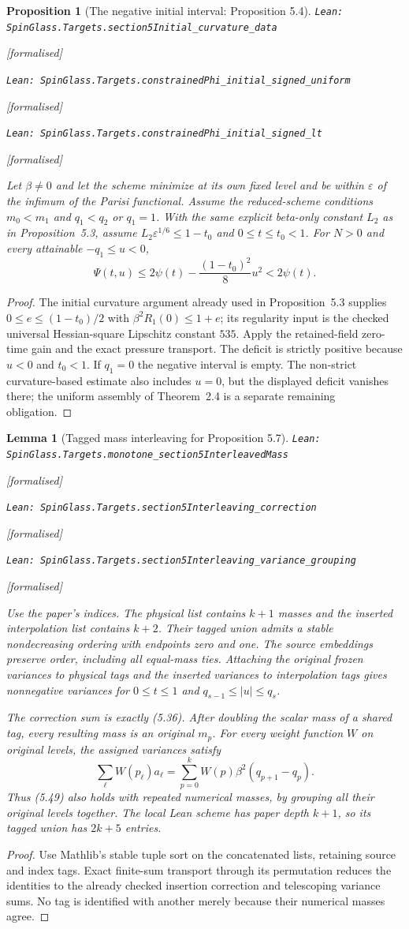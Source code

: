 \documentclass[11pt]{article}
\providecommand{\lean}[1]{\leavevmode\par\nopagebreak
  {\noindent\normalfont\footnotesize\raggedright\texttt{Lean: #1}\par}\nopagebreak}
\providecommand{\leanok}{\par\nopagebreak
  {\noindent\normalfont\footnotesize\textcolor{green!50!black}{[formalised]}\par}\nopagebreak}
\newtheorem{proposition}[theorem]{Proposition}
\newtheorem{lemma}[theorem]{Lemma}
\begin{document}
\begin{proposition}[The negative initial interval: Proposition 5.4]
\lean{SpinGlass.Targets.section5Initial\_curvature\_data}\leanok
\lean{SpinGlass.Targets.constrainedPhi\_initial\_signed\_uniform}\leanok
\lean{SpinGlass.Targets.constrainedPhi\_initial\_signed\_lt}\leanok
Let $\beta\ne0$ and let the scheme minimize at its own fixed level and be
within $\varepsilon$ of the infimum of the Parisi functional. Assume the
reduced-scheme conditions $m_0<m_1$ and $q_1<q_2$ or $q_1=1$.
With the same explicit beta-only constant $L_2$ as in Proposition~5.3,
assume $L_2\varepsilon^{1/6}\le1-t_0$ and $0\le t\le t_0<1$.
For $N>0$ and every attainable $-q_1\le u<0$,
\[
 \Psi(t,u)\le2\psi(t)-\frac{(1-t_0)^2}{8}u^2<2\psi(t).
\]
\end{proposition}
\begin{proof}
The initial curvature argument already used in Proposition~5.3 supplies
$0\le e\le(1-t_0)/2$ with $\beta^2R_1(0)\le1+e$; its regularity input is
the checked universal Hessian-square Lipschitz constant $535$.
Apply the retained-field zero-time gain and the exact pressure transport.
The deficit is strictly positive because $u<0$ and $t_0<1$.
If $q_1=0$ the negative interval is empty. The non-strict curvature-based
estimate also includes $u=0$, but the displayed deficit vanishes there;
the uniform assembly of Theorem~2.4 is a separate remaining obligation.
\end{proof}

\begin{lemma}[Tagged mass interleaving for Proposition 5.7]
\lean{SpinGlass.Targets.monotone\_section5InterleavedMass}\leanok
\lean{SpinGlass.Targets.section5Interleaving\_correction}\leanok
\lean{SpinGlass.Targets.section5Interleaving\_variance\_grouping}\leanok
Use the paper's indices. The physical list contains $k+1$ masses and the
inserted interpolation list contains $k+2$. Their tagged union admits a
stable nondecreasing ordering with endpoints zero and one. The source
embeddings preserve order, including all equal-mass ties. Attaching the
original frozen variances to physical tags and the inserted variances to
interpolation tags gives nonnegative variances for $0\le t\le1$ and
$q_{s-1}\le |u|\le q_s$.

The correction sum is exactly (5.36). After doubling the scalar mass of a
shared tag, every resulting mass is an original $m_p$. For every weight
function $W$ on original levels, the assigned variances satisfy
\[
 \sum_\ell W(p_\ell)a_\ell
   =\sum_{p=0}^{k}W(p)\beta^2(q_{p+1}-q_p).
\]
Thus (5.49) also holds with repeated numerical masses, by grouping all their
original levels together. The local Lean scheme has paper depth $k+1$, so
its tagged union has $2k+5$ entries.
\end{lemma}
\begin{proof}
Use Mathlib's stable tuple sort on the concatenated lists, retaining source
and index tags. Exact finite-sum transport through its permutation reduces
the identities to the already checked insertion correction and telescoping
variance sums. No tag is identified with another merely because their
numerical masses agree.
\end{proof}
\end{document}
